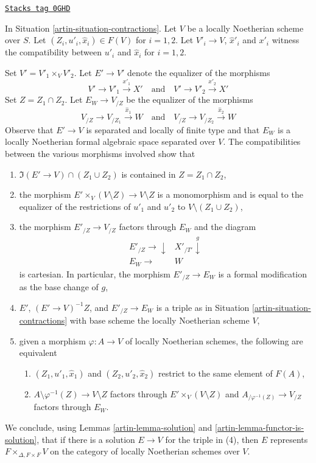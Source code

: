 \begin{remark}[Diagonal]
\label{artin-remark-diagonal}
\href{https://stacks.math.columbia.edu/tag/0GHD}{\texttt{Stacks tag 0GHD}}

In Situation \ref{artin-situation-contractions}.
Let $V$ be a locally Noetherian scheme over $S$.
Let $(Z_i, u'_i, \hat x_i) \in F(V)$ for $i = 1, 2$. Let $V'_i \to V$,
$\hat x'_i$ and $x'_i$ witness the compatibility between $u'_i$ and
$\hat x_i$ for $i = 1, 2$.

\medskip\noindent
Set $V' = V'_1 \times_V V'_2$. Let $E' \to V'$ denote the equalizer
of the morphisms
$$
V' \to V'_1 \xrightarrow{x'_1} X'
\quad\text{and}\quad
V' \to V'_2 \xrightarrow{x'_2} X'
$$
Set $Z = Z_1 \cap Z_2$. Let $E_W \to V_{/Z}$
be the equalizer of the morphisms
$$
V_{/Z} \to V_{/Z_1} \xrightarrow{\hat x_1} W
\quad\text{and}\quad
V_{/Z} \to V_{/Z_2} \xrightarrow{\hat x_2} W
$$
Observe that $E' \to V$ is separated and locally of finite type
and that $E_W$ is a locally Noetherian formal algebraic space
separated over $V$.
The compatibilities between the various morphisms involved show that
\begin{enumerate}
\item $\Im(E' \to V) \cap (Z_1 \cup Z_2)$
is contained in $Z = Z_1 \cap Z_2$,
\item the morphism $E' \times_V (V \setminus Z) \to V \setminus Z$
is a monomorphism and is equal to the equalizer of the restrictions
of $u'_1$ and $u'_2$ to $V \setminus (Z_1 \cup Z_2)$,
\item the morphism $E'_{/Z} \to V_{/Z}$ factors through $E_W$
and the diagram
$$
\begin{array}{cc}E'_{/Z} \longrightarrow\downarrow & X'_{/T'} \overset{g}{\downarrow} \\ E_W \longrightarrow & W\end{array}
$$
is cartesian. In particular, the morphism $E'_{/Z} \to E_W$
is a formal modification as the base change of $g$,
\item $E'$, $(E' \to V)^{-1}Z$, and $E'_{/Z} \to E_W$
is a triple as in Situation \ref{artin-situation-contractions}
with base scheme the locally Noetherian scheme $V$,
\item given a morphism $\varphi : A \to V$
of locally Noetherian schemes, the following are equivalent
\begin{enumerate}
\item $(Z_1, u'_1, \hat x_1)$ and $(Z_2, u'_2, \hat x_2)$
restrict to the same element of $F(A)$,
\item $A \setminus \varphi^{-1}(Z) \to V \setminus Z$
factors through $E' \times_V (V \setminus Z)$
and $A_{/\varphi^{-1}(Z)} \to V_{/Z}$
factors through $E_W$.
\end{enumerate}
\end{enumerate}
We conclude, using
Lemmas \ref{artin-lemma-solution} and \ref{artin-lemma-functor-is-solution},
that if there is a solution $E \to V$
for the triple in (4), then $E$ represents
$F \times_{\Delta, F \times F} V$ on the category of
locally Noetherian schemes over $V$.
\end{remark}

